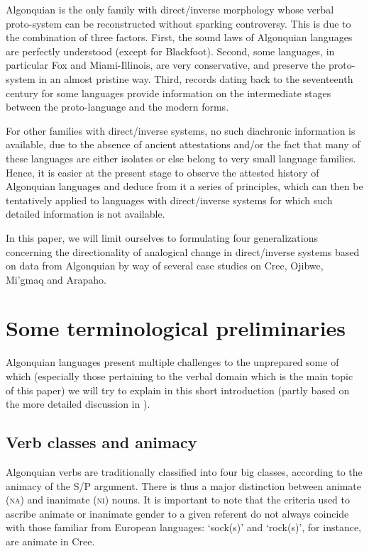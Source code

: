 \documentclass[twoside,a4paper,11pt]{article}
\newcommand{\Σ}{\greek{Σ}}
\newcommand{\nanim}{\textsc{na}}
\newcommand{\ninan}{\textsc{ni}}
\begin{document}
Algonquian is the only family with direct/inverse morphology whose verbal proto-system can be reconstructed without sparking controversy. This is due to the combination of three factors. First, the sound laws of Algonquian languages are perfectly understood (except for Blackfoot). Second, some languages, in particular Fox and Miami-Illinois, are very conservative, and preserve the proto-system in an almost pristine way. Third, records dating back to the seventeenth century for some languages provide information on the intermediate stages between the proto-language and the modern forms.
 
For other families with direct/inverse systems, no such diachronic information is available, due to the absence of ancient attestations and/or the fact that many of these languages are either isolates or else belong to very small language families. Hence, it is easier at the present stage to observe the attested history of Algonquian languages and deduce from it a series of principles, which can then be tentatively applied to languages with direct/inverse systems for which such detailed information is not available.

In this paper, we will limit ourselves to formulating  four generalizations concerning the directionality of analogical change in direct/inverse systems based on data from Algonquian by way of several case studies on Cree, Ojibwe, Mi'gmaq and Arapaho.

\section{Some terminological preliminaries}

Algonquian languages present multiple challenges to the unprepared some of which (especially those pertaining to the verbal domain which is the main topic of this paper) we will try to explain in this short introduction (partly based on the more detailed discussion in \citealp{jacques14inverse}).

\subsection{Verb classes and animacy}

Algonquian verbs are traditionally classified into four big classes, according to the animacy of the S/P argument. There is thus a major distinction between animate (\nanim) and inanimate (\ninan) nouns. It is important to note that the criteria used to ascribe animate or inanimate gender to a given referent do not always coincide with those familiar from European languages: `sock(s)' and `rock(s)', for instance, are animate in Cree.
\end{document}
